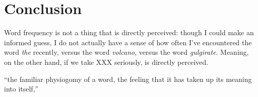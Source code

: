 \chapter{Conclusion}

Word frequency is not a thing that is directly perceived: though I could make an informed guess, I do not actually have a sense of how often I've encountered the word \emph{the} recently, versus the word \emph{volcano}, versus the word \emph{gulgirate}.  Meaning, on the other hand, if we take XXX seriously, is directly perceived.

``the familiar physiogomy of a word, the feeling that it has taken up its meaning into itself,'' \citep[][p. 218]{Wittgenstein}

